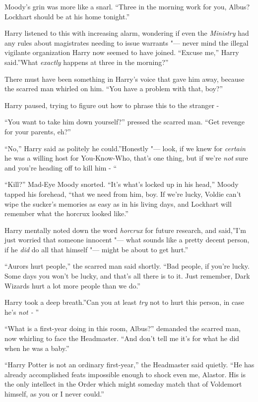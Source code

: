 Moody's grin was more like a snarl. ``Three in the morning work for you,
Albus? Lockhart should be at his home tonight.''

Harry listened to this with increasing alarm, wondering if even the
\emph{Ministry} had any rules about magistrates needing to issue
warrants "--- never mind the illegal vigilante organization Harry now
seemed to have joined. ``Excuse me,'' Harry said.''What \emph{exactly}
happens at three in the morning?''

There must have been something in Harry's voice that gave him away,
because the scarred man whirled on him. ``You have a problem with that,
boy?''

Harry paused, trying to figure out how to phrase this to the stranger -

``You want to take him down yourself?'' pressed the scarred man. ``Get
revenge for your parents, eh?''

``No,'' Harry said as politely he could.''Honestly "--- look, if we knew
for \emph{certain} he was a willing host for You-Know-Who, that's one
thing, but if we're \emph{not} sure and you're heading off to kill him -
``

``Kill?'' Mad-Eye Moody snorted. ``It's what's locked up in his head,''
Moody tapped his forehead, ``that we need from him, boy. If we're lucky,
Voldie can't wipe the sucker's memories as easy as in his living days,
and Lockhart will remember what the horcrux looked like.''

Harry mentally noted down the word \emph{horcrux} for future research,
and said,''I'm just worried that someone innocent "--- what sounds like a
pretty decent person, if he \emph{did} do all that himself "--- might be
about to get hurt.''

``Aurors hurt people,'' the scarred man said shortly. ``Bad people, if
you're lucky. Some days you won't be lucky, and that's all there is to
it. Just remember, Dark Wizards hurt a lot more people than we do.''

Harry took a deep breath.''Can you at least \emph{try} not to hurt this
person, in case he's \emph{not -} ''

``What is a first-year doing in this room, Albus?'' demanded the scarred
man, now whirling to face the Headmaster. ``And don't tell me it's for
what he did when he was a baby.''

``Harry Potter is not an ordinary first-year,'' the Headmaster said
quietly. ``He has already accomplished feats impossible enough to shock
even me, Alastor. His is the only intellect in the Order which might
someday match that of Voldemort himself, as you or I never could.''

